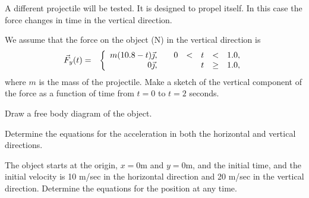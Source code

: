 \begin{problem}
\item A different projectile will be tested. It is designed to propel
  itself. In this case the force changes in time in the vertical
  direction.
  \begin{subproblem}
  \item We assume that the force on the object (N) in the vertical
    direction is
      \begin{eqnarray*}
        \vec{F}_y(t) & = & \left\{
                     \begin{array}{r@{\hspace{2em}}rcccl}
                       m(10.8-t) \vec{\jmath}, & 0 & < & t & < & 1.0, \\
                       0 \vec{\jmath},       &   &   & t & \geq & 1.0,
                     \end{array}
                     \right.
      \end{eqnarray*}
      where $m$ is the mass of the projectile.  Make a sketch of the
      vertical component of the force as a function of time from $t=0$
      to $t=2$ seconds.

      \vfill

    \item Draw a free body diagram of the object.
      \vfill

    \item Determine the equations for the acceleration in both the
      horizontal and vertical directions.

      \vfill

      \clearpage

    \item The object starts at the origin, $x=0$m and $y=0$m, and the
      initial time, and the initial velocity is 10 m/sec in the
      horizontal direction and 20 m/sec in the vertical
      direction. Determine the equations for the position at any time.

      \vfill

  \end{subproblem}

\clearpage



\end{problem}

\postClass

